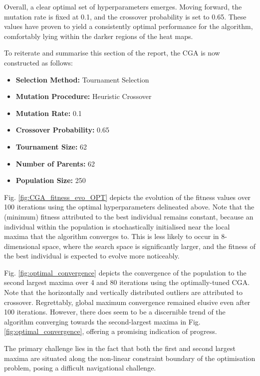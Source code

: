 \documentclass[10pt]{article}
\begin{document}
\begin{multicols}{2}
Overall, a clear optimal set of hyperparameters emerges. Moving forward, the mutation rate is fixed at 0.1, and the crossover probability is set to 0.65. These values have proven to yield a consistently optimal performance for the algorithm, comfortably lying within the darker regions of the heat maps.

To reiterate and summarise this section of the report, the CGA is now constructed as follows:

\begin{itemize}
    \item \textbf{Selection Method:} Tournament Selection
    \item \textbf{Mutation Procedure:} Heuristic Crossover
    \item \textbf{Mutation Rate:} 0.1
    \item \textbf{Crossover Probability:} 0.65
    \item \textbf{Tournament Size:} 62
    \item \textbf{Number of Parents:} 62
    \item \textbf{Population Size:} 250
\end{itemize}

Fig. \ref{fig:CGA_fitness_evo_OPT} depicts the evolution of the fitness values over 100 iterations using the optimal hyperparameters delineated above. Note that the (minimum) fitness attributed to the best individual remains constant, because an individual within the population is stochastically initialised near the local maxima that the algorithm converges to. This is less likely to occur in 8-dimensional space, where the search space is significantly larger, and the fitness of the best individual is expected to evolve more noticeably.

Fig. \ref{fig:optimal_convergence} depicts the convergence of the population to the second largest maxima over 4 and 80 iterations using the optimally-tuned CGA. Note that the horizontally and vertically distributed outliers are attributed to crossover. Regrettably, global maximum convergence remained elusive even after 100 iterations. However, there does seem to be a discernible trend of the algorithm converging towards the second-largest maxima in Fig. \ref{fig:optimal_convergence}, offering a promising indication of progress. 

The primary challenge lies in the fact that both the first and second largest maxima are situated along the non-linear constraint boundary of the optimisation problem, posing a difficult navigational challenge.


\end{multicols}
\end{document}
